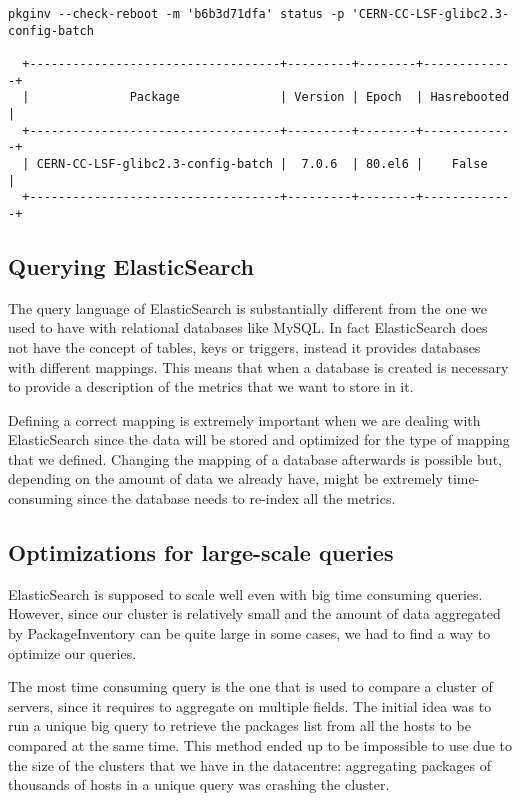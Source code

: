 \begin{itemize}
  \begin{lstlisting}[frame=single,basicstyle=\tiny]
  pkginv --check-reboot -m 'b6b3d71dfa' status -p 'CERN-CC-LSF-glibc2.3-config-batch

  +-----------------------------------+---------+--------+-------------+
  |              Package              | Version | Epoch  | Hasrebooted |
  +-----------------------------------+---------+--------+-------------+
  | CERN-CC-LSF-glibc2.3-config-batch |  7.0.6  | 80.el6 |    False    |
  +-----------------------------------+---------+--------+-------------+
  \end{lstlisting} 

\end{itemize}

\subsection{Querying ElasticSearch}

The query language of ElasticSearch is substantially different from the
one we used to have with relational databases like MySQL\@. In fact
ElasticSearch does not have the concept of tables, keys or triggers,
instead it provides databases with different mappings. This means that
when a database is created is necessary to provide a description of the
metrics that we want to store in it.

Defining a correct mapping is extremely important when we are dealing with
ElasticSearch since the data will be stored and optimized for the type of
mapping that we defined. Changing the mapping of a database afterwards is
possible but, depending on the amount of data we already have, might be
extremely time-consuming since the database needs to re-index all the
metrics.

\subsection{Optimizations for large-scale queries}

ElasticSearch is supposed to scale well even with big time consuming
queries. However, since our cluster is relatively small and the amount of
data aggregated by PackageInventory can be quite large in some cases, we
had to find a way to optimize our queries.

The most time consuming query is the one that is used to compare a cluster
of servers, since it requires to aggregate on multiple fields. The initial
idea was to run a unique big query to retrieve the packages list from all
the hosts to be compared at the same time. This method ended up to be
impossible to use due to the size of the clusters that we have in the
datacentre: aggregating packages of thousands of hosts in a unique query
was crashing the cluster.

